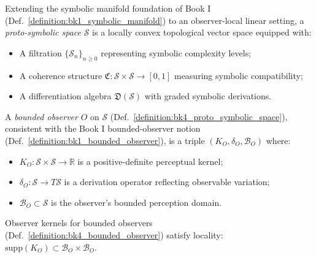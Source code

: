 \begin{definition}
\label{definition:bk4_proto_symbolic_space}
Extending the symbolic manifold foundation of Book I (Def.~\ref{definition:bk1_symbolic_manifold}) to an observer-local linear setting, a \emph{proto-symbolic space} $\mathcal{S}$ is a locally convex topological vector space equipped with:
\begin{itemize}
    \item A filtration $\{ \mathcal{S}_n \}_{n \geq 0}$ representing symbolic complexity levels;
    \item A coherence structure $\mathfrak{C} : \mathcal{S} \times \mathcal{S} \to [0,1]$ measuring symbolic compatibility;
    \item A differentiation algebra $\mathfrak{D}(\mathcal{S})$ with graded symbolic derivations.
\end{itemize}
\end{definition}

\begin{definition}
\label{definition:bk4_bounded_observer}
A \emph{bounded observer} $O$ on $\mathcal{S}$ (Def.~\ref{definition:bk4_proto_symbolic_space}), consistent with the Book I bounded-observer notion (Def.~\ref{definition:bk1_bounded_observer}), is a triple $(K_O, \delta_O, \mathcal{B}_O)$ where:
\begin{itemize}
    \item $K_O : \mathcal{S} \times \mathcal{S} \to \mathbb{R}$ is a positive-definite perceptual kernel;
    \item $\delta_O : \mathcal{S} \to T\mathcal{S}$ is a derivation operator reflecting observable variation;
    \item $\mathcal{B}_O \subset \mathcal{S}$ is the observer's bounded perception domain.
\end{itemize}
\end{definition}

\begin{axiom}
\label{axiom:bk4_observer_locality}
Observer kernels for bounded observers (Def.~\ref{definition:bk4_bounded_observer}) satisfy locality: $\mathrm{supp}(K_O) \subset \mathcal{B}_O \times \mathcal{B}_O$.
\end{axiom}

